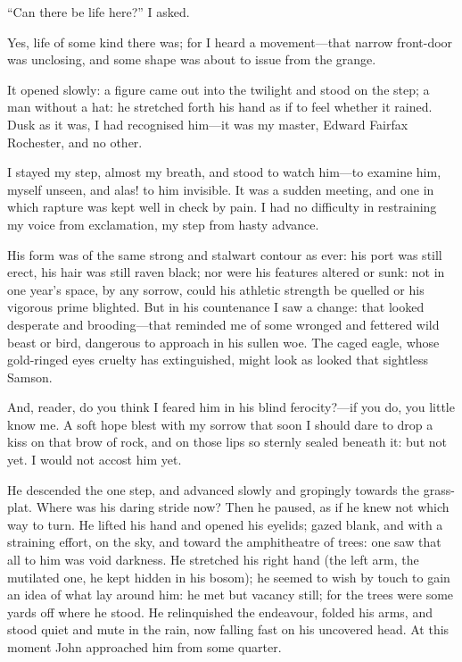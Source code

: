 \enquote{Can there be life here?} I asked.

Yes, life of some kind there was; for I heard a movement---that narrow
front-door was unclosing, and some shape was about to issue from the
grange.

It opened slowly: a figure came out into the twilight and stood on the
step; a man without a hat: he stretched forth his hand as if to feel
whether it rained. Dusk as it was, I had recognised him---it was my
master, Edward Fairfax Rochester, and no other.

I stayed my step, almost my breath, and stood to watch him---to examine
him, myself unseen, and alas! to him invisible. It was a sudden
meeting, and one in which rapture was kept well in check by pain. I had
no difficulty in restraining my voice from exclamation, my step from
hasty advance.

His form was of the same strong and stalwart contour as ever: his port
was still erect, his hair was still raven black; nor were his features
altered or sunk: not in one year's space, by any sorrow, could his
athletic strength be quelled or his vigorous prime blighted. But in his
countenance I saw a change: that looked desperate and brooding---that
reminded me of some wronged and fettered wild beast or bird, dangerous
to approach in his sullen woe. The caged eagle, whose gold-ringed eyes
cruelty has extinguished, might look as looked that sightless Samson.

And, reader, do you think I feared him in his blind ferocity?---if you
do, you little know me. A soft hope blest with my sorrow that soon I
should dare to drop a kiss on that brow of rock, and on those lips so
sternly sealed beneath it: but not yet. I would not accost him yet.

He descended the one step, and advanced slowly and gropingly towards the
grass-plat. Where was his daring stride now? Then he paused, as if he
knew not which way to turn. He lifted his hand and opened his eyelids;
gazed blank, and with a straining effort, on the sky, and toward the
amphitheatre of trees: one saw that all to him was void darkness. He
stretched his right hand (the left arm, the mutilated one, he kept
hidden in his bosom); he seemed to wish by touch to gain an idea of what
lay around him: he met but vacancy still; for the trees were some yards
off where he stood. He relinquished the endeavour, folded his arms, and
stood quiet and mute in the rain, now falling fast on his uncovered
head. At this moment John approached him from some quarter.

